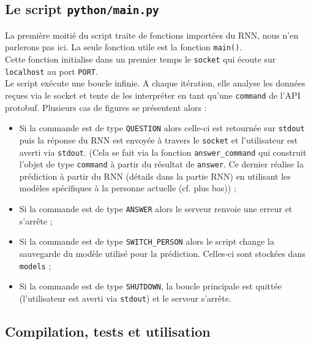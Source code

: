 \documentclass[10pt,a4paper]{article}
\newcommand\tab[1][0.5cm]{\hspace*{#1}}
\begin{document}
\subsection{Le script \texttt{python/main.py}}
La première moitié du script traite de fonctions importées du RNN, nous n'en parlerons pas ici. La seule fonction utile est la fonction \texttt{main()}. \\
\tab Cette fonction initialise dans un premier temps le \texttt{socket} qui écoute sur \texttt{localhost} au port \texttt{PORT}.\\
\tab Le script exécute une boucle infinie. A chaque itération, elle analyse les données reçues via le socket et tente de les interpréter en tant qu'une \texttt{command} de l'API protobuf. Plusieurs cas de figures se présentent alors :
\begin{itemize}
	\item Si la commande est de type \texttt{QUESTION} alors celle-ci est retournée sur \texttt{stdout} puis la réponse du RNN est envoyée à travers le \texttt{socket} et l'utilisateur est averti via \texttt{stdout}. (Cela se fait via la fonction \texttt{answer\_command} qui construit l'objet de type \texttt{command} à partir du résultat de \texttt{answer}. Ce dernier réalise la prédiction à partir du RNN (détails dans la partie RNN) en utilisant les modèles spécifiques à la personne actuelle (cf. plus bas)) ;
	\item Si la commande est de type \texttt{ANSWER} alors le serveur renvoie une erreur et s'arrête ;
	\item Si la commande est de type \texttt{SWITCH\_PERSON} alors le script change la sauvegarde du modèle utilisé pour la prédiction. Celles-ci sont stockées dans \texttt{models} ;
	\item Si la commande est de type \texttt{SHUTDOWN}, la boucle principale est quittée (l'utilisateur est averti via \texttt{stdout}) et le serveur s'arrête.
\end{itemize}
\subsection{Compilation, tests et utilisation}
\end{document}

